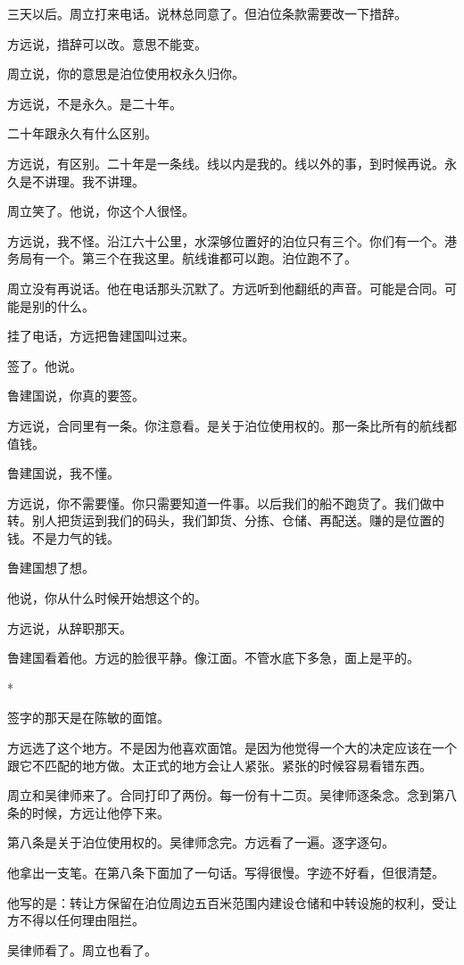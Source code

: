 \documentclass[UTF8,a5paper,11pt,openany]{ctexbook}
\newcommand{\scene}{\vspace{1em}\begin{center}*\quad*\quad*\end{center}\vspace{0.5em}}
\begin{document}
三天以后。周立打来电话。说林总同意了。但泊位条款需要改一下措辞。

方远说，措辞可以改。意思不能变。

周立说，你的意思是泊位使用权永久归你。

方远说，不是永久。是二十年。

二十年跟永久有什么区别。

方远说，有区别。二十年是一条线。线以内是我的。线以外的事，到时候再说。永久是不讲理。我不讲理。

周立笑了。他说，你这个人很怪。

方远说，我不怪。沿江六十公里，水深够位置好的泊位只有三个。你们有一个。港务局有一个。第三个在我这里。航线谁都可以跑。泊位跑不了。

周立没有再说话。他在电话那头沉默了。方远听到他翻纸的声音。可能是合同。可能是别的什么。

挂了电话，方远把鲁建国叫过来。

签了。他说。

鲁建国说，你真的要签。

方远说，合同里有一条。你注意看。是关于泊位使用权的。那一条比所有的航线都值钱。

鲁建国说，我不懂。

方远说，你不需要懂。你只需要知道一件事。以后我们的船不跑货了。我们做中转。别人把货运到我们的码头，我们卸货、分拣、仓储、再配送。赚的是位置的钱。不是力气的钱。

鲁建国想了想。

他说，你从什么时候开始想这个的。

方远说，从辞职那天。

鲁建国看着他。方远的脸很平静。像江面。不管水底下多急，面上是平的。


\scene

签字的那天是在陈敏的面馆。

方远选了这个地方。不是因为他喜欢面馆。是因为他觉得一个大的决定应该在一个跟它不匹配的地方做。太正式的地方会让人紧张。紧张的时候容易看错东西。

周立和吴律师来了。合同打印了两份。每一份有十二页。吴律师逐条念。念到第八条的时候，方远让他停下来。

第八条是关于泊位使用权的。吴律师念完。方远看了一遍。逐字逐句。

他拿出一支笔。在第八条下面加了一句话。写得很慢。字迹不好看，但很清楚。

他写的是：转让方保留在泊位周边五百米范围内建设仓储和中转设施的权利，受让方不得以任何理由阻拦。

吴律师看了。周立也看了。
\end{document}
